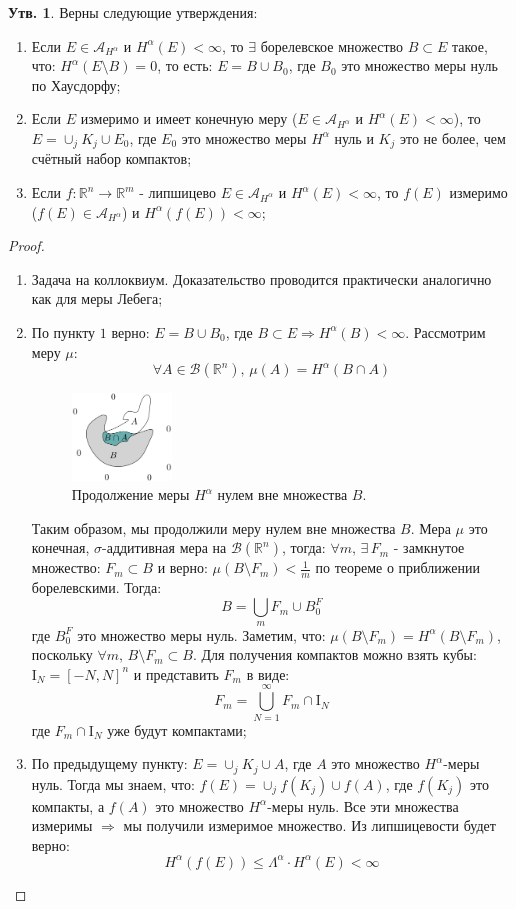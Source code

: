 \documentclass[12pt]{article}
\newcommand{\MR}{\mathbb{R}}
\newcommand{\MI}{\mathrm{I}}
\newcommand{\MA}{\mathcal{A}}
\newcommand{\MB}{\mathcal{B}}
\theoremstyle{definition}
\newtheorem{prop}{Утв.}
\begin{document}
\begin{prop}
	Верны следующие утверждения:
	\begin{enumerate}[label=\arabic*)]
		\item Если $E \in \MA_{H^\alpha}$ и $H^\alpha(E) < \infty$, то $\exists$ борелевское множество $B\subset E$ такое, что: $H^\alpha(E \setminus B) = 0$, то есть: $E = B \cup B_0$, где $B_0$ это множество меры нуль по Хаусдорфу;
		\item Если $E$ измеримо и имеет конечную меру ($E \in \MA_{H^\alpha}$ и $H^\alpha(E) < \infty$), то $E = \cup_j K_j \cup E_0$, где $E_0$ это множество меры $H^\alpha$ нуль и $K_j$ это не более, чем счётный набор компактов;
		\item Если $f \colon \MR^n \to \MR^m$ - липшицево $E \in \MA_{H^\alpha}$ и $H^\alpha(E) < \infty$, то $f(E)$ измеримо ($f(E) \in \MA_{H^\alpha}$) и $H^\alpha(f(E)) < \infty$;
	\end{enumerate}
\end{prop}
\begin{proof}\hfill
	\begin{enumerate}[label=\arabic*)]
		\item Задача на коллоквиум. Доказательство проводится практически аналогично как для меры Лебега;
		\item По пункту $1$	верно: $E = B \cup B_0$, где $B\subset E \Rightarrow H^\alpha(B) < \infty$. Рассмотрим меру $\mu$:
		$$
			\forall A \in \MB(\MR^n), \, \mu(A) = H^\alpha(B\cap A)
		$$
		\begin{figure}[H]
			\centering
			\includegraphics[width=0.25\textwidth]{MA4L14_1.png}
			\caption{Продолжение меры $H^\alpha$ нулем вне множества $B$.}
			\label{14_1}
		\end{figure}
		Таким образом, мы продолжили меру нулем вне множества $B$. Мера $\mu$ это конечная, $\sigma$-аддитивная мера на $\MB(\MR^n)$, тогда: $\forall m, \, \exists \, F_m$ - замкнутое множество: $F_m \subset B$ и верно: $\mu(B \setminus F_m) < \tfrac{1}{m}$ по теореме о приближении борелевскими. Тогда: 
		$$
 			B = \bigcup\limits_m F_m \cup B_0^F
		$$
		где $B_0^F$ это множество меры нуль. Заметим, что: $\mu(B \setminus F_m) = H^\alpha(B \setminus F_m)$, поскольку $\forall m, \, B \setminus F_m \subset B$. Для получения компактов можно взять кубы: $\MI_N = [-N, N]^n$ и представить $F_m$ в виде:
		$$
			F_m = \bigcup\limits_{N = 1}^{\infty}F_m \cap \MI_N
		$$
		где $F_m \cap \MI_N$ уже будут компактами;
		\item По предыдущему пункту: $E = \cup_j K_j \cup A$, где $A$ это множество $H^\alpha$-меры нуль. Тогда мы знаем, что: $f(E) = \cup_j f(K_j)\cup f(A)$, где $f(K_j)$ это компакты, а $f(A)$ это множество $H^\alpha$-меры нуль. Все эти множества измеримы $\Rightarrow$ мы получили измеримое множество. Из липшицевости будет верно:
		$$
			H^\alpha(f(E)) \leq \Lambda^\alpha{\cdot}H^\alpha(E) < \infty
		$$
	\end{enumerate}
\end{proof}
\end{document}
